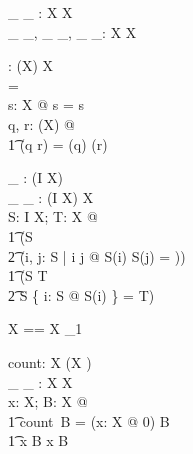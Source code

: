 \documentclass[11pt,a4paper]{article}
\begin{document}

\begin{gendef}[X]
        \_ \extract \_ : \power \nat \cross \seq X \fun \seq X \\
	\_ \prefix \_, \_ \suffix \_, \_ \inseq \_: \seq X \rel \seq X \\
\end{gendef}


\begin{gendef}[X]
        \dcat: \seq (\seq X) \fun \seq X \\
\where
	\dcat \langle \rangle = \langle \rangle \\
	\forall s: \seq X @ \dcat \langle s \rangle = s \\
	\forall q, r: \seq (\seq X) @ \\
	\t1	\dcat (q \cat r) = (\dcat q) \cat (\dcat r) \\
\end{gendef}


\begin{gendef}[I, X]
        \disjoint \_ : \power (I \pfun \power X) \\
        \_ \partition \_ : (I \pfun \power X) \rel \power X \\
\where
	\forall S: I \pfun \power X; T: \power X @ \\
	\t1	(\disjoint S \iff \\
	\t2		(\forall i, j: \dom S | i \neq j @
				S(i) \cap S(j) = \emptyset)) \land \\
	\t1	(S \partition T \iff \\
	\t2		\disjoint S \land \bigcup \{ i: \dom S @ S(i) \} = T) \\
\end{gendef}


\begin{zed}
	\bag X == X \pfun \nat_1 \\
\end{zed}

\begin{gendef}[X]
	count: \bag X \inj (X \fun \nat) \\
        \_ \inbag \_ :  X \rel \bag X \\
\where
	\forall x: X; B: \bag X @ \\
	\t1	count~B = (\lambda x: X @ 0) \oplus B \land \\
	\t1	x \inbag B \iff x \in \dom B \\
\end{gendef}
\end{document}

